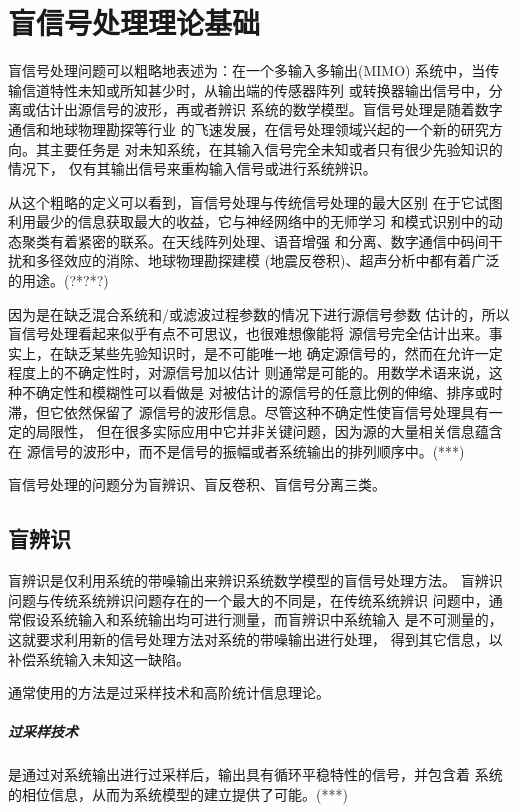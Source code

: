 ﻿%

\chapter{盲信号处理理论基础}
\label{chap01}


盲信号处理问题可以粗略地表述为：在一个多输入多输出(MIMO)
系统中，当传输信道特性未知或所知甚少时，从输出端的传感器阵列
或转换器输出信号中，分离或估计出源信号的波形，再或者辨识
系统的数学模型。盲信号处理是随着数字通信和地球物理勘探等行业
的飞速发展，在信号处理领域兴起的一个新的研究方向。其主要任务是
对未知系统，在其输入信号完全未知或者只有很少先验知识的情况下，
仅有其输出信号来重构输入信号或进行系统辨识。

从这个粗略的定义可以看到，盲信号处理与传统信号处理的最大区别
在于它试图利用最少的信息获取最大的收益，它与神经网络中的无师学习
和模式识别中的动态聚类有着紧密的联系。在天线阵列处理、语音增强
和分离、数字通信中码间干扰和多径效应的消除、地球物理勘探建模
(地震反卷积)、超声分析中都有着广泛的用途。(?*?*?)

因为是在缺乏混合系统和/或滤波过程参数的情况下进行源信号参数
估计的，所以盲信号处理看起来似乎有点不可思议，也很难想像能将
源信号完全估计出来。事实上，在缺乏某些先验知识时，是不可能唯一地
确定源信号的，然而在允许一定程度上的不确定性时，对源信号加以估计
则通常是可能的。用数学术语来说，这种不确定性和模糊性可以看做是
对被估计的源信号的任意比例的伸缩、排序或时滞，但它依然保留了
源信号的波形信息。尽管这种不确定性使盲信号处理具有一定的局限性，
但在很多实际应用中它并非关键问题，因为源的大量相关信息蕴含在
源信号的波形中，而不是信号的振幅或者系统输出的排列顺序中。(***)

盲信号处理的问题分为盲辨识、盲反卷积、盲信号分离三类。

\section{盲辨识}
盲辨识是仅利用系统的带噪输出来辨识系统数学模型的盲信号处理方法。
盲辨识问题与传统系统辨识问题存在的一个最大的不同是，在传统系统辨识
问题中，通常假设系统输入和系统输出均可进行测量，而盲辨识中系统输入
是不可测量的，这就要求利用新的信号处理方法对系统的带噪输出进行处理，
得到其它信息，以补偿系统输入未知这一缺陷。

通常使用的方法是过采样技术和高阶统计信息理论。
\paragraph*{过采样技术}
是通过对系统输出进行过采样后，输出具有循环平稳特性的信号，并包含着
系统的相位信息，从而为系统模型的建立提供了可能。(***)

